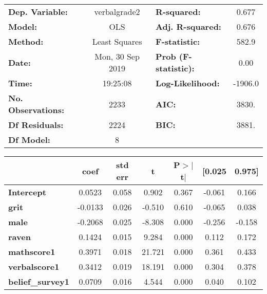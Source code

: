 \documentclass{report}
\begin{document}
\begin{center}
\begin{tabular}{lclc}
\toprule
\textbf{Dep. Variable:}    &   verbalgrade2   & \textbf{  R-squared:         } &     0.677   \\
\textbf{Model:}            &       OLS        & \textbf{  Adj. R-squared:    } &     0.676   \\
\textbf{Method:}           &  Least Squares   & \textbf{  F-statistic:       } &     582.9   \\
\textbf{Date:}             & Mon, 30 Sep 2019 & \textbf{  Prob (F-statistic):} &     0.00    \\
\textbf{Time:}             &     19:25:08     & \textbf{  Log-Likelihood:    } &   -1906.0   \\
\textbf{No. Observations:} &        2233      & \textbf{  AIC:               } &     3830.   \\
\textbf{Df Residuals:}     &        2224      & \textbf{  BIC:               } &     3881.   \\
\textbf{Df Model:}         &           8      & \textbf{                     } &             \\
\bottomrule
\end{tabular}
\begin{tabular}{lcccccc}
                         & \textbf{coef} & \textbf{std err} & \textbf{t} & \textbf{P$> |$t$|$} & \textbf{[0.025} & \textbf{0.975]}  \\
\midrule
\textbf{Intercept}       &       0.0523  &        0.058     &     0.902  &         0.367        &       -0.061    &        0.166     \\
\textbf{grit}            &      -0.0133  &        0.026     &    -0.510  &         0.610        &       -0.065    &        0.038     \\
\textbf{male}            &      -0.2068  &        0.025     &    -8.308  &         0.000        &       -0.256    &       -0.158     \\
\textbf{raven}           &       0.1424  &        0.015     &     9.284  &         0.000        &        0.112    &        0.172     \\
\textbf{mathscore1}      &       0.3971  &        0.018     &    21.721  &         0.000        &        0.361    &        0.433     \\
\textbf{verbalscore1}    &       0.3412  &        0.019     &    18.191  &         0.000        &        0.304    &        0.378     \\
\textbf{belief\_survey1} &       0.0709  &        0.016     &     4.544  &         0.000        &        0.040    &        0.102     \\

\end{tabular}
\end{center}
\end{document}
